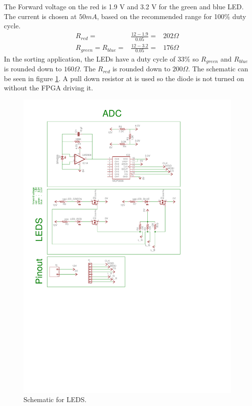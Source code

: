 The Forward voltage on the red is 1.9 V and 3.2 V for the green and blue LED\cite{ds:red_led,ds:gb_led}.
The current is chosen at $50 mA$, based on the recommended range for 100\% duty cycle\cite[p. 2]{apnote:led}.
\begin{eqnarray}
 R_{red} =& \frac{12-1.9}{0.05} =& 202 \Omega \nonumber \\
 R_{green} = R_{blue} =& \frac{12-3.2}{0.05} =& 176 \Omega \nonumber 
\end{eqnarray}
In the sorting application, the LEDs have a duty cycle of 33\% so $R_{green}$ and $R_{blue}$ is rounded down to $160 \Omega$.
The $R_{red}$ is rounded down to $200\Omega$.
The schematic can be seen in figure \ref{fig:sch_led}.
A pull down resistor at is used so the diode is not turned on without the FPGA driving it.

\begin{figure}[ht]
\centering
 \includegraphics[scale=0.9,trim={2.4cm 14cm 5.1cm 9cm},clip]{img/adc_schematic.pdf}
  \caption{Schematic for LEDS.}
  \label{fig:sch_led}
\end{figure}

